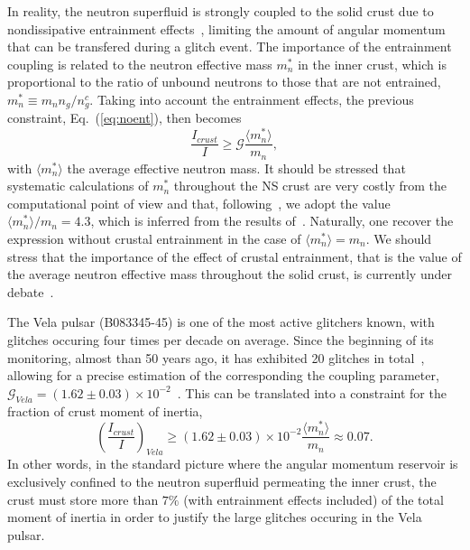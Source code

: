 In reality, the neutron superfluid is strongly coupled to the solid crust due
to nondissipative entrainment effects~\cite{Chamel2013}, limiting the amount of
angular momentum that can be transfered during a glitch event. The importance
of the entrainment coupling is related to the neutron effective mass $m_n^*$ in
the inner crust, which is proportional to the ratio of unbound neutrons to 
those that are not entrained, $m_n^* \equiv m_n n_g/n_g^c$. Taking into 
account the entrainment effects, the previous constraint, Eq.~(\ref{eq:noent}), 
then becomes~\cite{Andersson2012}
%
\begin{equation}
  \frac{I_{crust}}{I} \geq \mathcal{G}\frac{\langle m_n^* \rangle}{m_n},
\end{equation}
%
with $\langle m_n^* \rangle$ the average effective neutron mass.
It should be stressed that systematic calculations of $m_n^*$ throughout 
the NS crust are very costly from the computational point of view and that,
following~\cite{Andersson2012,Piekarewicz2014}, we adopt the 
value $\langle m_n^* \rangle /m_n = 4.3$, which is inferred from the 
results of~\cite{Chamel2012}. Naturally, one recover the expression without 
crustal entrainment in the case of $\langle m_n^* \rangle = m_n$. We should 
stress that the importance of the effect of crustal entrainment, that is the 
value of the average neutron effective mass throughout the solid crust, is 
currently under debate~\cite{Martin2016,Watanabe2017}.

The Vela pulsar (B083345-45) is one of the most active glitchers known, with
glitches occuring four times per decade on average. Since the beginning of its 
monitoring, almost than 50 years ago, it has exhibited 20 glitches in
total~\cite{Glitches}, allowing for a precise estimation of the corresponding 
the coupling parameter, $\mathcal{G}_{Vela} = (1.62 \pm 0.03) \times
10^{-2}$~\cite{Ho2015}. This can be translated into a constraint for 
the fraction of crust moment of inertia,
%
\begin{equation}
  \left(\frac{I_{crust}}{I}\right)_{Vela} \geq (1.62 \pm 0.03) \times 10^{-2}
  \frac{\langle m_n^* \rangle}{m_n} \approx 0.07.
\end{equation}
%
In other words, in the standard picture where the angular momentum reservoir is 
exclusively confined to the neutron superfluid permeating the inner crust, the 
crust must store more than $7\%$ (with entrainment effects included) of the 
total moment of inertia in order to justify the large glitches occuring in the 
Vela pulsar.

